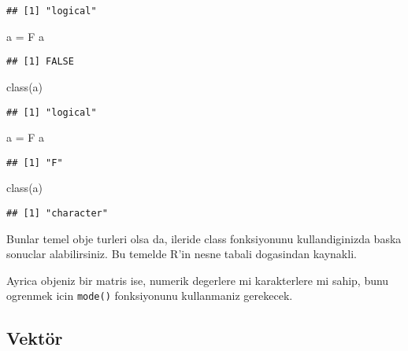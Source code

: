 \documentclass[
]{book}
\newenvironment{Shaded}{\begin{snugshade}}{\end{snugshade}}
\newcommand{\FunctionTok}[1]{\textcolor[rgb]{0.00,0.00,0.00}{#1}}
\newcommand{\NormalTok}[1]{#1}
\newcommand{\OtherTok}[1]{\textcolor[rgb]{0.56,0.35,0.01}{#1}}
\newcommand{\StringTok}[1]{\textcolor[rgb]{0.31,0.60,0.02}{#1}}
\begin{document}
\begin{verbatim}
## [1] "logical"
\end{verbatim}

\begin{Shaded}
\begin{Highlighting}[]
\NormalTok{a }\OtherTok{=}\NormalTok{ F}
\NormalTok{a}
\end{Highlighting}
\end{Shaded}

\begin{verbatim}
## [1] FALSE
\end{verbatim}

\begin{Shaded}
\begin{Highlighting}[]
\FunctionTok{class}\NormalTok{(a)}
\end{Highlighting}
\end{Shaded}

\begin{verbatim}
## [1] "logical"
\end{verbatim}

\begin{Shaded}
\begin{Highlighting}[]
\NormalTok{a }\OtherTok{=} \StringTok{\textquotesingle{}F\textquotesingle{}}
\NormalTok{a}
\end{Highlighting}
\end{Shaded}

\begin{verbatim}
## [1] "F"
\end{verbatim}

\begin{Shaded}
\begin{Highlighting}[]
\FunctionTok{class}\NormalTok{(a)}
\end{Highlighting}
\end{Shaded}

\begin{verbatim}
## [1] "character"
\end{verbatim}

Bunlar temel obje turleri olsa da, ileride class fonksiyonunu kullandiginizda baska sonuclar alabilirsiniz. Bu temelde R'in nesne tabali dogasindan kaynakli.

Ayrica objeniz bir matris ise, numerik degerlere mi karakterlere mi sahip, bunu ogrenmek icin \texttt{mode()} fonksiyonunu kullanmaniz gerekecek.

\hypertarget{vektuxf6r}{%
\subsection{Vektör}\label{vektuxf6r}}
\end{document}
